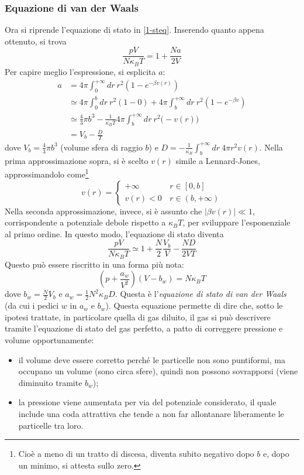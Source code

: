 \documentclass[11pt, a4paper]{scrartcl}
\theoremstyle{style}
\theoremstyle{style1}
\numberwithin{equation}{subsection}
\begin{document}
\subsubsection{Equazione di van der Waals}



Ora si riprende l'equazione di stato in \ref{1-steq}. 
Inserendo quanto appena ottenuto, si trova 
\[
\frac{pV}{N\kappa _B T} = 1 + \frac{Na}{2V}
\] 
Per capire meglio l'espressione, si esplicita $a$:
\[
\begin{split}
	a &= 4 \pi \int_{0} ^{+\infty} dr \ r^2 \left(1 - e ^{-\beta v(r)}\right) \\
	  &\simeq 4\pi \int_{0} ^b dr \ r^2 (1-0) + 4 \pi \int_{b} ^{+\infty} dr \ r ^2 \left(1-e^{-\beta  v}\right) \\
	  &\simeq \frac{4}{3}\pi b^3 - \frac{1}{\kappa _B T}4 \pi \int_{b} ^{+\infty} dr \ r^2 \big(-v(r)\big) \\
	  &= V_b - \frac{D}{T}
\end{split}
\] 
dove $V_b = \frac{4}{3}\pi b^3$ (volume sfera di raggio $b$) e $D = -\frac{1}{\kappa _B}\int_{b} ^{+\infty} dr \ 4\pi r^2 v(r)$.
Nella prima approssimazione sopra, si \`e scelto $v(r)$ simile a Lennard-Jones, approssimandolo come\footnote{Cio\`e a meno di un tratto di discesa, diventa subito negativo dopo $b$ e, dopo un minimo, si attesta sullo zero.}
\[
v(r) = \begin{cases}
	+\infty&\, r \in [0,b]\\
	       v(r)<0&\, r \in (b,+\infty)
\end{cases}
\] 
Nella seconda approssimazione, invece, si \`e assunto che $\lvert \beta v(r) \rvert \ll 1$, corrispondente a potenziale debole rispetto a $\kappa _B T$, per sviluppare l'esponenziale al primo ordine.
In questo modo, l'equazione di stato diventa 
\[
\frac{pV}{N\kappa _BT}\simeq 1+\frac{N}{2} \frac{V_b}{V}-\frac{ND}{2VT}
\] 
Questo pu\`o essere riscritto in una forma pi\`u nota:
\begin{equation}
	\left(p+\frac{a_w}{V^2}\right) \left(V-b_w\right) = N\kappa _B T
\end{equation}
dove $b_w = \frac{N}{2}V_b$ e $a_w = \frac{1}{2}N^2 \kappa _B D	$.
Questa \`e l'\textit{equazione di stato di van der Waals} (da cui i pedici $w$ in $a_w$ e $b_w$).
Questa equazione permette di dire che, sotto le ipotesi trattate, in particolare quella di gas diluito, il gas si pu\`o descrivere tramite l'equazione di stato del gas perfetto, a patto di correggere pressione e volume opportunamente:
\begin{itemize}
	\item il volume deve essere corretto perch\'e le particelle non sono puntiformi, ma occupano un volume (sono circa sfere), quindi non possono sovrapporsi (viene diminuito tramite $b_w$);
	\item la pressione viene aumentata per via del potenziale considerato, il quale include una coda attrattiva che tende a non far allontanare liberamente le particelle tra loro.
\end{itemize}
\end{document}
